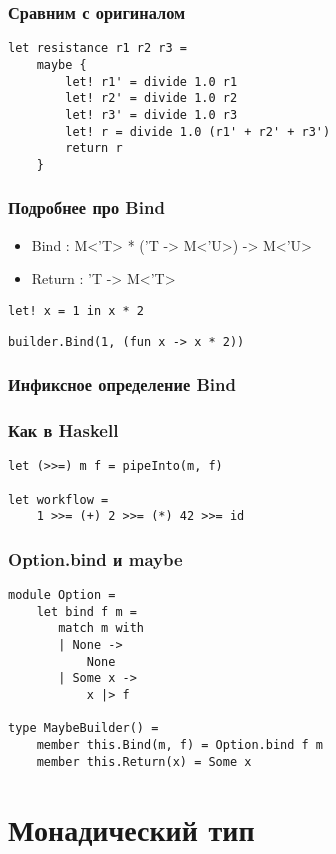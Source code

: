\documentclass{../../slides-style}
\begin{document}
    \begin{frame}[fragile]
        \frametitle{Сравним с оригиналом}
        \begin{verbatim}
let resistance r1 r2 r3 = 
    maybe {
        let! r1' = divide 1.0 r1
        let! r2' = divide 1.0 r2
        let! r3' = divide 1.0 r3
        let! r = divide 1.0 (r1' + r2' + r3')
        return r
    }
        \end{verbatim}
    \end{frame}

    \begin{frame}[fragile]
        \frametitle{Подробнее про Bind}
        \begin{itemize}
            \item Bind : M<'T> * ('T -> M<'U>) -> M<'U>
            \item Return : 'T -> M<'T>
        \end{itemize}
        \begin{verbatim}
let! x = 1 in x * 2
        \end{verbatim}
        \begin{verbatim}
builder.Bind(1, (fun x -> x * 2))
        \end{verbatim}
    \end{frame}

    \begin{frame}[fragile]
        \frametitle{Инфиксное определение Bind}
        \frametitle{Как в Haskell}
        \begin{verbatim}
let (>>=) m f = pipeInto(m, f)

let workflow = 
    1 >>= (+) 2 >>= (*) 42 >>= id
        \end{verbatim}
    \end{frame}

    \begin{frame}[fragile]
        \frametitle{Option.bind и maybe}
        \begin{verbatim}
module Option = 
    let bind f m =
       match m with
       | None -> 
           None
       | Some x -> 
           x |> f 

type MaybeBuilder() =
    member this.Bind(m, f) = Option.bind f m
    member this.Return(x) = Some x
        \end{verbatim}
    \end{frame}

    \section{Монадический тип}
\end{document}
